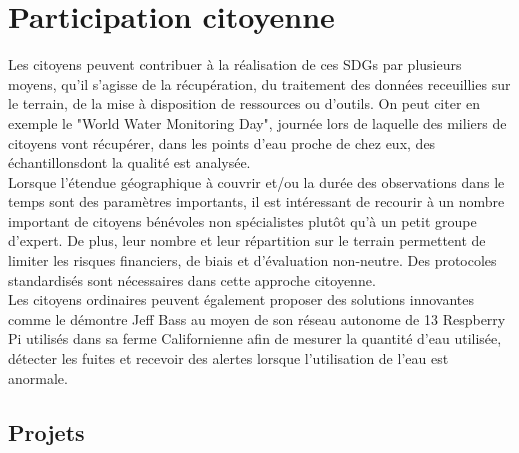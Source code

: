 \documentclass[10pt, conference, compsocconf]{llncs}
\begin{document}
\section{Participation citoyenne}
	Les citoyens peuvent contribuer à la réalisation de ces SDGs par plusieurs moyens, qu'il s'agisse de la récupération, du traitement des données receuillies sur le terrain, de la mise à disposition de ressources ou d'outils. On peut citer en exemple le "World Water Monitoring Day", journée lors de laquelle des miliers de citoyens vont récupérer, dans les points d'eau proche de chez eux, des échantillonsdont la qualité est analysée. \\
	Lorsque l'étendue géographique à couvrir et/ou la durée des observations dans le temps sont des paramètres importants, il est intéressant de recourir à un nombre important de citoyens bénévoles non spécialistes plutôt qu'à un petit groupe d'expert. De plus, leur nombre et leur répartition sur le terrain permettent de limiter les risques financiers, de biais et d'évaluation non-neutre. Des protocoles standardisés sont nécessaires dans cette approche citoyenne.\\
	Les citoyens ordinaires peuvent également proposer des solutions innovantes comme le démontre Jeff Bass au moyen de son réseau autonome de 13 Respberry Pi utilisés dans sa ferme Californienne afin de mesurer la quantité d'eau utilisée, détecter les fuites et recevoir des alertes lorsque l'utilisation de l'eau est anormale.

	\subsection{Projets}
\end{document}
